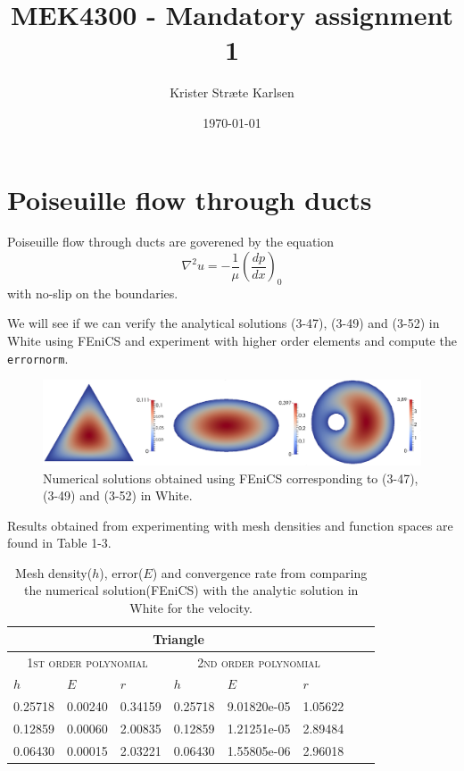 \documentclass[11pt,a4paper,english]{article}
\title{MEK4300 - Mandatory assignment 1}
\author{Krister Stræte Karlsen}
\date{\today}
\numberwithin{equation}{section}
\begin{document}
\maketitle

\section{Poiseuille flow through ducts}

Poiseuille flow through ducts are goverened by the equation 
\begin{equation}
\nabla^2 u = -\frac{1}{\mu}\left( \frac{dp}{dx} \right)_0  
\end{equation}
with no-slip on the boundaries.  

We will see if we can verify the analytical solutions (3-47), (3-49) and (3-52) in White using FEniCS and experiment with higher order elements and compute the \texttt{errornorm}. 

\begin{figure}[h!] 
\begin{center}
  \includegraphics[scale=0.18]{ducts.png}
  \end{center}
  \caption{Numerical solutions obtained using FEniCS corresponding to (3-47), (3-49) and (3-52) in White.}
\end{figure}

Results obtained from experimenting with mesh densities and function spaces are found in Table 1-3.

\begin{table}[H]
\centering
\caption{Mesh density($h$), error($E$) and convergence rate from comparing the numerical solution(FEniCS) with the analytic solution in White for the velocity. }
\vspace{3mm}
\begin{tabular}{|l|l|l|l|l|l|l|l|}
\hline
 \multicolumn{6}{|c|}{\textbf{Triangle}}   \\
\hline
 \multicolumn{3}{|c|}{ \textsc{1st order polynomial}} &  \multicolumn{3}{|c|}{\textsc{2nd order polynomial}}  \\
\hline
$h$ & $E$ & $r$ & $h$ & $E$ & $r$   \\
\hline
0.25718 & 0.00240 & 0.34159	& 0.25718 & 9.01820e-05 & 1.05622 \\
0.12859 & 0.00060 & 2.00835	& 0.12859 & 1.21251e-05 & 2.89484 \\
0.06430 & 0.00015 & 2.03221 & 0.06430 & 1.55805e-06 & 2.96018	\\ 
\hline
\end{tabular}
\label{tab:time}
\end{table}
\end{document}
